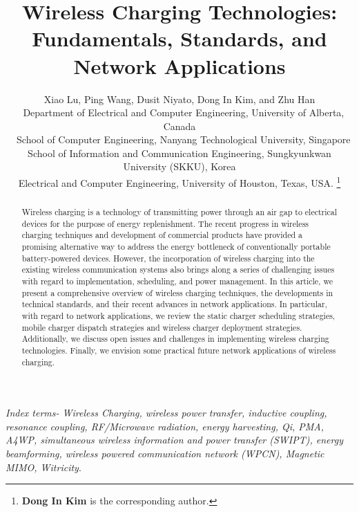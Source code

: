\documentclass[twocolumn,10pt]{IEEEtran}
\begin{document}
\title{Wireless Charging Technologies: Fundamentals, Standards, and Network Applications}
 \author{ Xiao Lu, Ping Wang,  Dusit Niyato, Dong In Kim, and Zhu Han\\
 ~ Department of Electrical and Computer Engineering, University of Alberta, Canada \\
    ~ School of Computer Engineering, Nanyang Technological University, Singapore \\
      School of Information and Communication Engineering, Sungkyunkwan University (SKKU), Korea \\
      Electrical and Computer Engineering, University of Houston, Texas, USA.
    \thanks{ {\bf Dong In Kim} is the corresponding author.}
   }
   
    
    
\maketitle
\begin{abstract}
 
Wireless charging is a technology of transmitting power through an air gap to electrical devices for the purpose of energy replenishment. The recent progress in wireless charging techniques and development of commercial products have provided a promising alternative way to address the energy bottleneck of conventionally portable battery-powered devices. However, the incorporation of wireless charging into the existing wireless communication systems also brings along a series of challenging issues with regard to implementation, scheduling, and power management. In this article, we present a comprehensive overview of wireless charging techniques, the developments in technical standards, and their recent advances in network applications. In particular, with regard to network applications, we review the static charger scheduling strategies, mobile charger dispatch strategies and wireless charger deployment strategies. Additionally, we discuss open issues and challenges in implementing wireless charging technologies. Finally, we envision some practical future network applications of wireless charging.
 
\end{abstract}

\emph{Index terms- Wireless Charging, wireless power transfer, inductive coupling, resonance coupling, RF/Microwave radiation, energy harvesting, Qi, PMA, A4WP, simultaneous wireless information and power transfer (SWIPT), energy beamforming, wireless powered communication network (WPCN), Magnetic MIMO, Witricity}. 
\end{document}
